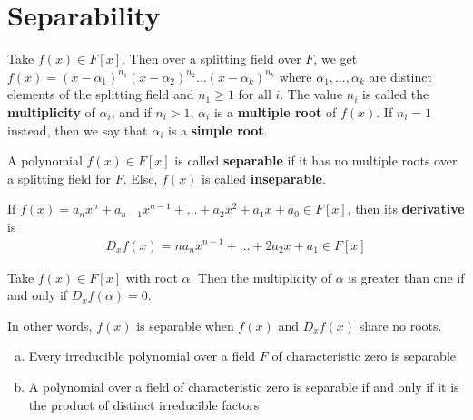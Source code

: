 \documentclass{memoir}
\begin{document}


\section{Separability}
\label{sec:separability}

\begin{defn}[Multiplicity]
	Take \(f(x) \in F[x]\). Then over a splitting field over \(F\), we get \(f(x) = (x-\alpha_1)^{n_1}(x-\alpha_2)^{n_2}\ldots(x-\alpha_k)^{n_k}\) where \(\alpha_1,\ldots,\alpha_k\) are distinct elements of the splitting field and \(n_1\geq 1\) for all \(i\). The value \(n_i\) is called the \textbf{multiplicity} of \(\alpha_i\), and if  \(n_i>1\), \(\alpha_i\) is a \textbf{multiple root} of \(f(x)\). If \(n_i=1\) instead, then we say that \(\alpha_i\) is a \textbf{simple root}.
\end{defn}

\begin{defn}
	A polynomial \(f(x) \in F[x]\) is called \textbf{separable} if it has no multiple roots over a splitting field for \(F\). Else, \(f(x)\) is called \textbf{inseparable}.
\end{defn}

\begin{defn}
	If \(f(x) = a_n x^{n} + a_{n-1}x^{n-1} + \ldots + a_2 x^{2} + a_1x + a_0 \in F[x]\), then its \textbf{derivative} is
	\begin{align*}
		D_xf(x) = na_n x^{n-1}+ \ldots + 2a_2 x + a_1 \in F[x]
	\end{align*}
\end{defn}

\begin{prop}
	Take \(f(x) \in F[x]\) with root \(\alpha \). Then the multiplicity of \(\alpha \) is greater than one if and only if \(D_xf(\alpha ) = 0\).
\end{prop}
In other words, \(f(x)\) is separable when \(f(x)\) and \(D_xf(x)\) share no roots.

\begin{cor}
	\begin{enumerate}[(a).]
		\item Every irreducible polynomial over a field \(F\) of characteristic zero is separable
		\item A polynomial over a field of characteristic zero is separable if and only if it is the product of distinct irreducible factors
	\end{enumerate}
\end{cor}
\end{document}
